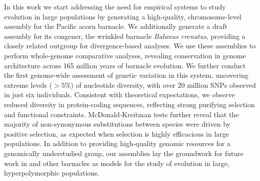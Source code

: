In this work we start addressing the need for empirical systems to study evolution in
large populations by generating a high-quality, chromosome-level assembly for the Pacific
acorn barnacle.
We additionally generate a draft assembly for its congener, the wrinkled barnacle
\textit{Balanus crenatus}, providing a closely related outgroup for divergence-based analyses.
We use these assemblies to perform whole-genome comparative analyses, revealing conservation
in genome architecture across 165 million years of barnacle evolution.
We further conduct the first genome-wide assessment of genetic variation in this system,
uncovering extreme levels ($>5\%$) of nucleotide diversity, with over 20 million SNPs
observed in just six individuals.
Consistent with theoretical expectations, we observe reduced diversity in protein-coding
sequences, reflecting strong purifying selection and functional
constraints.
McDonald-Kreitman tests further reveal that the majority of non-synonymous substitutions
between species were driven by positive selection, as expected when selection is highly
efficacious in large populations.
In addition to providing high-quality genomic resources for a genomically understudied
group, our assemblies lay the groundwork for future work in \bgla{} and other barnacles as
models for the study of evolution in large, hyperpolymorphic populations.
\vspace{0.1cm}

